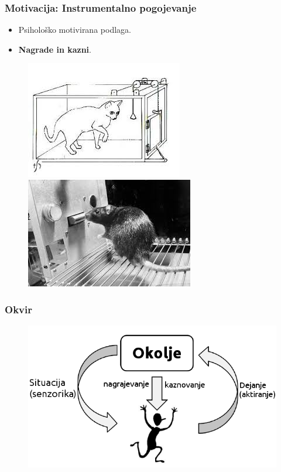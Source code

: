 \documentclass{beamer}    %
\begin{document}
\begin{frame}
    \frametitle{Motivacija: Instrumentalno pogojevanje}
    \begin{itemize}
        \item Psihološko motivirana podlaga. 
        \item \textbf{Nagrade in kazni}.
    \end{itemize}

    \begin{figure}[b]
        \includegraphics[scale=0.47]{slike/macka.jpg}
        \includegraphics[scale=0.5]{slike/miska.jpg}
    \end{figure}
            
\end{frame}


\begin{frame}
    \frametitle{Okvir}
    \begin{figure}
        \includegraphics[scale=0.5]{slike/RLloop.png}
    \end{figure}
\end{frame}
\end{document}
